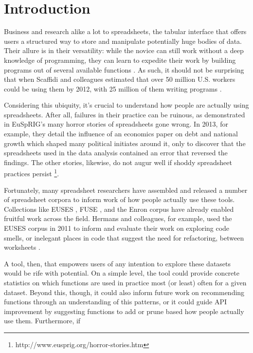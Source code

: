\documentclass[conference]{IEEEtran}
\begin{document}
	\section{Introduction} Business and research alike a lot to spreadsheets, the
	tabular interface that offers users a structured way to store and manipulate
	potentially huge bodies of data. Their allure is in their versatility: while
	the novice can still work without a deep knowledge of programming, they can
	learn to expedite their work by building programs out of several available
	functions \cite{nardi1990spreadsheet}. As such, it should not be surprising
	that when Scaffidi and colleagues estimated that over 50 million U.S. workers
	could be using them by 2012, with 25 million of them writing programs 
	\cite{scaffidi2005estimating}. \par Considering this ubiquity, it's crucial to
	understand how people are actually using spreadsheets. After all, failures in
	their practice can be ruinous, as demonstrated in EuSpRIG's many horror stories
	of spreadsheets gone wrong. In 2013, for example, they detail the influence of
	an economics paper on debt and national growth which shaped many political
	initiates around it, only to discover that the spreadsheets used in the data
	analysis contained an error that reversed the findings. The other stories,
	likewise, do not augur well if shoddy spreadsheet practices persist
	\footnote{http://www.eusprig.org/horror-stories.htm}. \par Fortunately, many
	spreadsheet researchers have assembled and released a number of spreadsheet
	corpora to inform work of how people actually use these tools. Collections like
	EUSES \cite{fisher2005euses}, FUSE \cite{barik2015fuse}, and the Enron corpus
	\cite{hermans2015enron} have already enabled fruitful work across the field.
	Hermans and colleagues, for example, used the EUSES corpus in 2011 to inform
	and evaluate their work on exploring code smells, or inelegant places in code
	that suggest the need for refactoring, between worksheets
	\cite{hermans2012detecting}. \par A tool, then, that empowers users of any
	intention to explore these datasets would be rife with potential. On a simple
	level, the tool could provide concrete statistics on which functions are used
	in practice most (or least) often for a given dataset. Beyond this, though, it
	could also inform future work on recommending functions through an
	understanding of this patterns, or it could guide API improvement by suggesting
	functions to add or prune based how people actually use them. Furthermore, if
\end{document}
